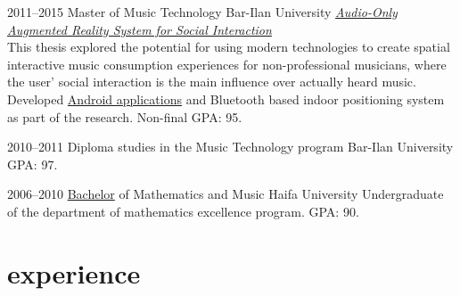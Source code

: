 \documentclass[]{friggeri-cv}  %
\begin{document}
\begin{entrylist}

    \entry
    {2011--2015}
    {Master {\normalfont of Music Technology}}
    {Bar-Ilan University}
    {\href{http://tomgurion.blogspot.co.il/p/master-thesis.html}{\emph{Audio-Only Augmented Reality System for Social Interaction}}\\
    This thesis explored the potential for using modern technologies to create spatial interactive music consumption experiences for non-professional musicians, where the user' social interaction is the main influence over actually heard music.\\
    Developed \href{https://github.com/Nagasaki45/ScenePlayer-Plus/}{Android applications} and Bluetooth based indoor positioning system as part of the research. Non-final GPA: 95.}

\end{entrylist}
\begin{entrylist}

    \entry
    {2010--2011}
    {Diploma studies {\normalfont in the Music Technology program}}
    {Bar-Ilan University}
    {GPA: 97.}

\end{entrylist}
\begin{entrylist}

    \entry
    {2006--2010}
    {\href{http://db.tt/i2NzAkni}{Bachelor} {\normalfont of Mathematics and Music}}
    {Haifa University}
    {Undergraduate of the department of mathematics excellence program. GPA: 90.}

\end{entrylist}


\section{experience}
\end{document}
